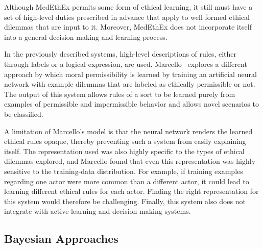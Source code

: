\documentclass[11pt]{article}
\begin{document}
Although MedEthEx permits some form of ethical learning, it still must have a set of high-level duties prescribed in advance that apply to well formed ethical dilemmas that are input to it. Moreover, MedEthEx does not incorporate itself into a general decision-making and learning process.

In the previously described systems, high-level descriptions of rules, either through labels or a logical expression, are used. Marcello~ explores a different approach by which moral permissibility is learned by training an artificial neural network with example dilemmas that are labeled as ethically permissible or not. The output of this system allows rules of a sort to be learned purely from examples of permissible and impermissible behavior and allows novel scenarios to be classified. 

A limitation of Marcello's model is that the neural network renders the learned ethical rules opaque, thereby preventing such a system from easily explaining itself. The representation used was also highly specific to the types of ethical dilemmas explored, and Marcello found that even this representation was highly-sensitive to the training-data distribution. For example, if training examples regarding one actor were more common than a different actor, it could lead to learning different ethical rules for each actor. Finding the right representation for this system would therefore be challenging. Finally, this system also does not integrate with active-learning and decision-making systems. 


\subsection{Bayesian Approaches}
\end{document}
